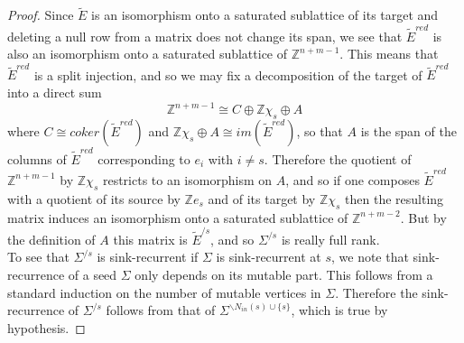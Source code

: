 \documentclass[11pt]{amsart}
\theoremstyle{definition}
\theoremstyle{remark}
\numberwithin{equation}{section}
\begin{document}
\begin{proof}
     Since $\tilde{E}$ is an isomorphism onto a saturated sublattice of its target and deleting a null row from a matrix does not change its span, we see that $\tilde{E}^{red}$ is also an isomorphism onto a saturated sublattice of $\mathbb{Z}^{n + m - 1}$. This means that $\tilde{E}^{red}$ is a split injection, and so we may fix a decomposition of the target of $\tilde{E}^{red}$ into a direct sum \begin{equation}
        \mathbb{Z}^{n + m - 1} \cong C \oplus \mathbb{Z}\chi_s \oplus A
    \end{equation}
    where $C \cong coker(\tilde{E}^{red})$ and $\mathbb{Z}\chi_s \oplus A \cong im(\tilde{E}^{red})$, so that $A$ is the span of the columns of $\tilde{E}^{red}$ corresponding to $e_i$ with $i \neq s$. Therefore the quotient of $\mathbb{Z}^{n + m - 1}$ by $\mathbb{Z}\chi_s$ restricts to an isomorphism on $A$, and so if one composes $\tilde{E}^{red}$ with a quotient of its source by $\mathbb{Z}e_s$ and of its target by $\mathbb{Z}\chi_s$ then the resulting matrix induces an isomorphism onto a saturated sublattice of $\mathbb{Z}^{n + m - 2}$. But by the definition of $A$ this matrix is $\tilde{E}^{/s}$, and so $\Sigma^{/s}$ is really full rank.\\

    To see that $\Sigma^{/s}$ is sink-recurrent if $\Sigma$ is sink-recurrent at $s$, we note that sink-recurrence of a seed $\Sigma$ only depends on its mutable part. This follows from a standard induction on the number of mutable vertices in $\Sigma$. Therefore the sink-recurrence of $\Sigma^{/s}$ follows from that of $\Sigma^{\backslash N_{in}(s) \cup \{s\}}$, which is true by hypothesis.
\end{proof}
\end{document}
